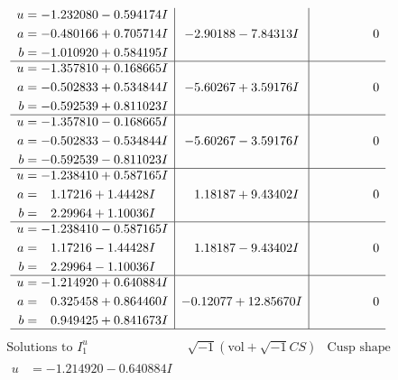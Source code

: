 \documentclass[1p]{elsarticle_modified}
\theoremstyle{definition}
\newcommand{\I}{\sqrt{-1}}
\begin{document}
$$\begin{array}{c|c|c}
\begin{aligned}
u &= -1.232080 - 0.594174 I \\
a &= -0.480166 + 0.705714 I \\
b &= -1.010920 + 0.584195 I\end{aligned}
 & -2.90188 - 7.84313 I & \phantom{-0.000000 } 0 \\ \hline\begin{aligned}
u &= -1.357810 + 0.168665 I \\
a &= -0.502833 + 0.534844 I \\
b &= -0.592539 + 0.811023 I\end{aligned}
 & -5.60267 + 3.59176 I & \phantom{-0.000000 } 0 \\ \hline\begin{aligned}
u &= -1.357810 - 0.168665 I \\
a &= -0.502833 - 0.534844 I \\
b &= -0.592539 - 0.811023 I\end{aligned}
 & -5.60267 - 3.59176 I & \phantom{-0.000000 } 0 \\ \hline\begin{aligned}
u &= -1.238410 + 0.587165 I \\
a &= \phantom{-}1.17216 + 1.44428 I \\
b &= \phantom{-}2.29964 + 1.10036 I\end{aligned}
 & \phantom{-}1.18187 + 9.43402 I & \phantom{-0.000000 } 0 \\ \hline\begin{aligned}
u &= -1.238410 - 0.587165 I \\
a &= \phantom{-}1.17216 - 1.44428 I \\
b &= \phantom{-}2.29964 - 1.10036 I\end{aligned}
 & \phantom{-}1.18187 - 9.43402 I & \phantom{-0.000000 } 0 \\ \hline\begin{aligned}
u &= -1.214920 + 0.640884 I \\
a &= \phantom{-}0.325458 + 0.864460 I \\
b &= \phantom{-}0.949425 + 0.841673 I\end{aligned}
 & -0.12077 + 12.85670 I & \phantom{-0.000000 } 0\\
 \hline 
 \end{array}$$\newpage$$\begin{array}{c|c|c}  
\text{Solutions to }I^u_{1}& \I (\text{vol} + \sqrt{-1}CS) & \text{Cusp shape}\\
 \hline 
\begin{aligned}
u &= -1.214920 - 0.640884 I \\

\end{aligned}
\end{array}$$
\end{document}
